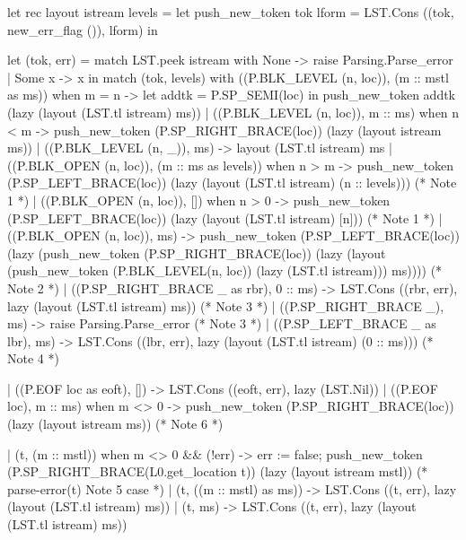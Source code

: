 \documentclass[mingoth,a4paper]{jsarticle}
\begin{document}
\begin{commandline}
let rec layout istream levels =
  let push_new_token tok lform =
    LST.Cons ((tok, new_err_flag ()), lform)
  in

  let (tok, err) =
    match LST.peek istream with
        None -> raise Parsing.Parse_error
      | Some x -> x
  in
    match (tok, levels) with
        ((P.BLK_LEVEL (n, loc)), (m :: mstl as ms)) when m = n ->
          let addtk = P.SP_SEMI(loc) in
            push_new_token addtk (lazy (layout (LST.tl istream) ms))
      | ((P.BLK_LEVEL (n, loc)), m :: ms) when n < m  ->
          push_new_token (P.SP_RIGHT_BRACE(loc)) (lazy (layout istream ms))
      | ((P.BLK_LEVEL (n, _)), ms)                         -> layout (LST.tl istream) ms
      | ((P.BLK_OPEN (n, loc)), (m :: ms as levels)) when n > m  ->
          push_new_token (P.SP_LEFT_BRACE(loc)) (lazy (layout (LST.tl istream) (n :: levels))) (* Note 1 *)
      | ((P.BLK_OPEN (n, loc)), []) when n > 0             ->
          push_new_token (P.SP_LEFT_BRACE(loc)) (lazy (layout (LST.tl istream) [n])) (* Note 1 *)
      | ((P.BLK_OPEN (n, loc)), ms)                        ->
          push_new_token
            (P.SP_LEFT_BRACE(loc))
            (lazy (push_new_token
                     (P.SP_RIGHT_BRACE(loc))
                     (lazy (layout (push_new_token
                                      (P.BLK_LEVEL(n, loc))
                                      (lazy (LST.tl istream))) ms)))) (* Note 2 *)
      | ((P.SP_RIGHT_BRACE _ as rbr), 0 :: ms)        ->
          LST.Cons ((rbr, err), lazy (layout (LST.tl istream) ms)) (* Note 3 *)
      | ((P.SP_RIGHT_BRACE _), ms)                   -> raise Parsing.Parse_error (* Note 3 *)
      | ((P.SP_LEFT_BRACE _ as lbr), ms)             -> 
          LST.Cons ((lbr, err), lazy (layout (LST.tl istream) (0 :: ms))) (* Note 4 *)

      | ((P.EOF loc as eoft), [])                    -> LST.Cons ((eoft, err), lazy (LST.Nil))
      | ((P.EOF loc), m :: ms) when m <> 0           -> 
          push_new_token (P.SP_RIGHT_BRACE(loc)) (lazy (layout istream ms)) (* Note 6 *)

      | (t, (m :: mstl)) when m <> 0 && (!err)       ->
          err := false;
          push_new_token (P.SP_RIGHT_BRACE(L0.get_location t)) (lazy (layout istream mstl))
          (* parse-error(t) Note 5 case *)
      | (t, ((m :: mstl) as ms))                   ->
          LST.Cons ((t, err),
                   lazy (layout (LST.tl istream) ms))
      | (t, ms)                                    ->
          LST.Cons ((t, err),
                   lazy (layout (LST.tl istream) ms))
\end{commandline}
\end{document}

